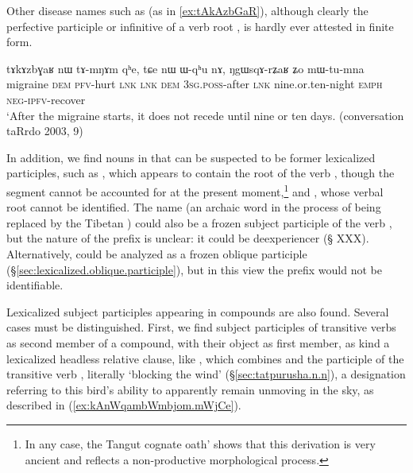 Other disease names such as  (as in \ref{ex:tAkAzbGaR}), although clearly the perfective participle or infinitive of a verb root , is hardly ever attested in finite form.

\begin{exe}
\ex \label{ex:tAkAzbGaR}
 \gll tɤkɤzbɣaʁ nɯ tɤ-mŋɤm qʰe, tɕe nɯ ɯ-qʰu nɤ, ŋgɯsqɤ-rʑaʁ ʑo mɯ-tu-mna \\
 migraine \textsc{dem} \textsc{pfv}-hurt \textsc{lnk} \textsc{lnk} \textsc{dem} \textsc{3sg}.\textsc{poss}-after \textsc{lnk} nine.or.ten-night \textsc{emph} \textsc{neg}-\textsc{ipfv}-recover \\
\glt `After the migraine starts, it does not recede until nine or ten days. (conversation taRrdo 2003, 9)
\end{exe}

In addition, we find nouns in  that can be suspected to be former lexicalized participles, such as , which appears to contain the root of the verb   , though the segment  cannot be accounted for at the present moment,\footnote{In any case, the Tangut cognate   oath' shows that this derivation is very ancient and reflects a non-productive morphological process. } and , whose verbal root cannot be identified. The name  (an archaic word in the process of being replaced by the Tibetan ) could also be a frozen subject participle  of the verb , but the nature of the prefix  is unclear: it could be deexperiencer (§ XXX). Alternatively,  could be analyzed as a frozen oblique participle (§\ref{sec:lexicalized.oblique.participle}), but in this view the prefix  would not be identifiable.

Lexicalized subject participles appearing in compounds are also found. Several cases must be distinguished. First, we find subject participles of transitive verbs as second member of a compound, with their object as first member, as kind a lexicalized headless relative clause, like , which combines   and the participle   of the transitive verb , literally `blocking the wind'   (§\ref{sec:tatpurusha.n.n}), a designation referring to this bird's ability to apparently remain unmoving in the sky, as described in (\ref{ex:kAnWqambWmbjom.mWjCe}).

